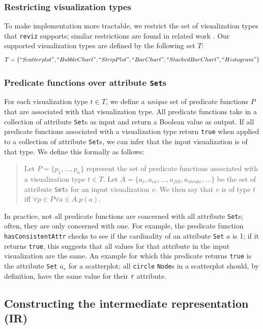 \documentclass[acmsmall,screen,nonacm]{acmart}
\newcommand{\code}[1]{\texttt{#1}}
\begin{document}
\subsubsection{Restricting visualization types}

To make implementation more tractable, we restrict the set of visualization types that \code{reviz} supports; similar restrictions are found in related work \cite{poco_heer:2017, wang_etal:2019}. Our supported visualization types are defined by the following set $T$:
$$T = \{``Scatterplot", ``BubbleChart", ``StripPlot", ``BarChart", ``StackedBarChart", ``Histogram"\}$$

\subsubsection{Predicate functions over attribute \code{Set}s}

For each visualization type $t \in T$, we define a \emph{unique} set of predicate functions $P$ that are associated with that visualization type. All predicate functions take in a collection of attribute \code{Set}s as input and return a Boolean value as output. If all predicate functions associated with a visualization type return \code{true} when applied to a collection of attribute \code{Set}s, we can infer that the input visualization is of that type. We define this formally as follows:

\begin{quote}
  Let $P = \{p_1, ..., p_n\}$ represent the set of predicate functions associated with a visualization type $t \in T$. Let $A = \{a_r, a_{cx}, ..., a_{fill}, a_{stroke}, ...\}$ be the set of attribute \code{Set}s for an input visualization $v$. We then say that $v$ is of type $t$ iff $\forall p \in P\forall a \in A. p(a)$.
\end{quote}

In practice, not all predicate functions are concerned with all attribute \code{Set}s; often, they are only concerned with one. For example, the predicate function \code{hasConsistentAttr} checks to see if the cardinality of an attribute \code{Set} $a$ is 1; if it returns \code{true}, this suggests that all values for that attribute in the input visualization are the same. An example for which this predicate returns \code{true} is the attribute \code{Set} $a_r$ for a scatterplot; all \code{circle} \code{Node}s in a scatterplot should, by definition, have the same value for their \code{r} attribute.

\subsection{Constructing the intermediate representation (IR)}
\end{document}
